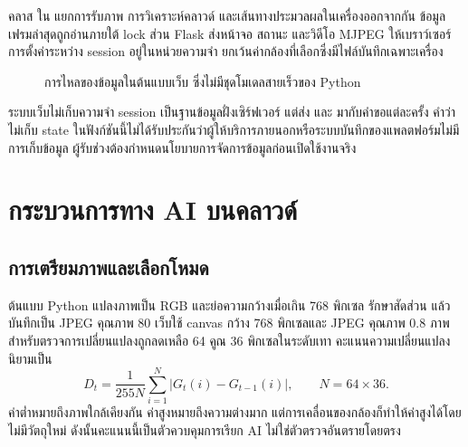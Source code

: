คลาส  ใน  แยกการรับภาพ การวิเคราะห์คลาวด์ และเส้นทางประมวลผลในเครื่องออกจากกัน ข้อมูลเฟรมล่าสุดถูกอ่านภายใต้ lock ส่วน Flask ส่งหน้าจอ สถานะ และวิดีโอ MJPEG ให้เบราว์เซอร์ การตั้งค่าระหว่าง session อยู่ในหน่วยความจำ ยกเว้นค่ากล้องที่เลือกซึ่งมีไฟล์บันทึกเฉพาะเครื่อง

\begin{figure}[H]\centering
{}
\caption{การไหลของข้อมูลในต้นแบบเว็บ ซึ่งไม่มีชุดโมเดลสายเร็วของ Python}
\end{figure}

ระบบเว็บไม่เก็บความจำ session เป็นฐานข้อมูลฝั่งเซิร์ฟเวอร์ แต่ส่ง  และ  มากับคำขอแต่ละครั้ง คำว่าไม่เก็บ state ในฟังก์ชันนี้ไม่ได้รับประกันว่าผู้ให้บริการภายนอกหรือระบบบันทึกของแพลตฟอร์มไม่มีการเก็บข้อมูล ผู้รับช่วงต้องกำหนดนโยบายการจัดการข้อมูลก่อนเปิดใช้งานจริง

\section{กระบวนการทาง AI บนคลาวด์}
\subsection{การเตรียมภาพและเลือกโหมด}
ต้นแบบ Python แปลงภาพเป็น RGB และย่อความกว้างเมื่อเกิน 768 พิกเซล รักษาสัดส่วน แล้วบันทึกเป็น JPEG คุณภาพ 80 เว็บใช้ canvas กว้าง 768 พิกเซลและ JPEG คุณภาพ 0.8 ภาพสำหรับตรวจการเปลี่ยนแปลงถูกลดเหลือ 64 คูณ 36 พิกเซลในระดับเทา คะแนนความเปลี่ยนแปลงนิยามเป็น
\begin{equation}
D_t=\frac{1}{255N}\sum_{i=1}^{N}|G_t(i)-G_{t-1}(i)|,\qquad N=64\times36.
\end{equation}
ค่าต่ำหมายถึงภาพใกล้เคียงกัน ค่าสูงหมายถึงความต่างมาก แต่การเคลื่อนของกล้องก็ทำให้ค่าสูงได้โดยไม่มีวัตถุใหม่ ดังนั้นคะแนนนี้เป็นตัวควบคุมการเรียก AI ไม่ใช่ตัวตรวจอันตรายโดยตรง

